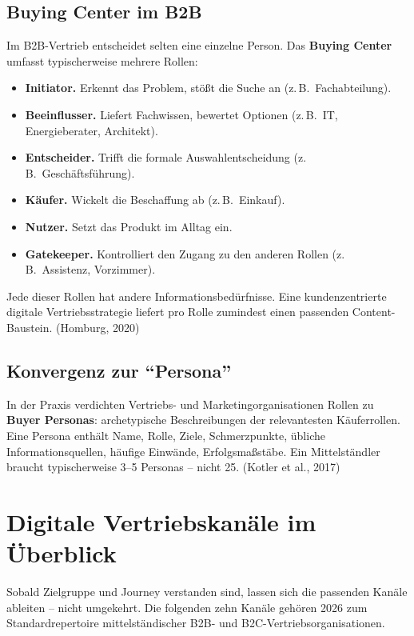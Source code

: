 \documentclass[11pt,a4paper,oneside]{article}
\newcommand{\fachbegriff}[1]{\textbf{#1}}
\newcommand{\quelle}[1]{{\footnotesize\color{lpGray}(#1)}}
\begin{document}
\subsection{Buying Center im B2B}

Im B2B-Vertrieb entscheidet selten eine einzelne Person. Das \fachbegriff{Buying Center} umfasst typischerweise mehrere Rollen:

\begin{itemize}
  \item \textbf{Initiator.} Erkennt das Problem, stößt die Suche an (z.\,B.\ Fachabteilung).
  \item \textbf{Beeinflusser.} Liefert Fachwissen, bewertet Optionen (z.\,B.\ IT, Energieberater, Architekt).
  \item \textbf{Entscheider.} Trifft die formale Auswahlentscheidung (z.\,B.\ Geschäftsführung).
  \item \textbf{Käufer.} Wickelt die Beschaffung ab (z.\,B.\ Einkauf).
  \item \textbf{Nutzer.} Setzt das Produkt im Alltag ein.
  \item \textbf{Gatekeeper.} Kontrolliert den Zugang zu den anderen Rollen (z.\,B.\ Assistenz, Vorzimmer).
\end{itemize}

Jede dieser Rollen hat andere Informationsbedürfnisse. Eine kundenzentrierte digitale Vertriebsstrategie liefert pro Rolle zumindest einen passenden Content-Baustein. \quelle{Homburg, 2020}

\subsection{Konvergenz zur ``Persona''}

In der Praxis verdichten Vertriebs- und Marketingorganisationen Rollen zu \fachbegriff{Buyer Personas}: archetypische Beschreibungen der relevantesten Käufer\-rollen. Eine Persona enthält Name, Rolle, Ziele, Schmerzpunkte, übliche Informationsquellen, häufige Einwände, Erfolgsmaßstäbe. Ein Mittelständler braucht typischerweise 3--5 Personas -- nicht 25. \quelle{Kotler et al., 2017}

\section{Digitale Vertriebskanäle im Überblick}

Sobald Zielgruppe und Journey verstanden sind, lassen sich die passenden Kanäle ableiten -- nicht umgekehrt. Die folgenden zehn Kanäle gehören 2026 zum Standardrepertoire mittelständischer B2B- und B2C-Vertriebsorganisationen.
\end{document}
